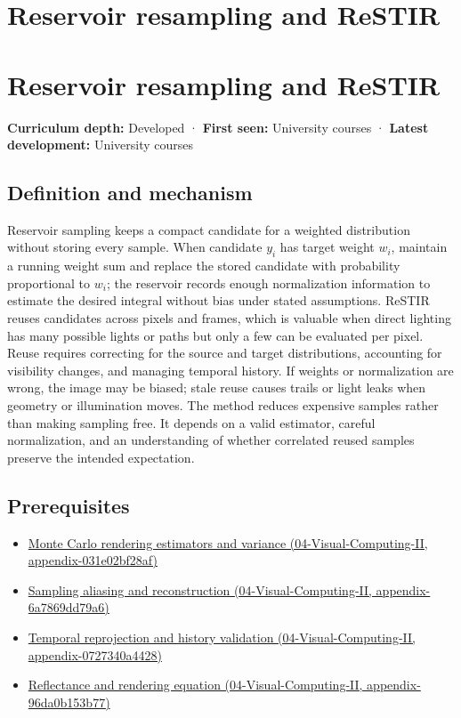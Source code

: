\hypertarget{appendix-68be451b78b1}{}
\section*{Reservoir resampling and ReSTIR}
\section{Reservoir resampling and ReSTIR}\label{appendix-68be451b78b1-reservoir-resampling-and-restir}

\textbf{Curriculum depth:} Developed · \textbf{First seen:} University courses · \textbf{Latest development:} University courses

\subsection{Definition and mechanism}\label{appendix-68be451b78b1-definition-and-mechanism}

Reservoir sampling keeps a compact candidate for a weighted distribution without storing every sample. When candidate \(y_i\) has target weight \(w_i\), maintain a running weight sum and replace the stored candidate with probability proportional to \(w_i\); the reservoir records enough normalization information to estimate the desired integral without bias under stated assumptions. ReSTIR reuses candidates across pixels and frames, which is valuable when direct lighting has many possible lights or paths but only a few can be evaluated per pixel. Reuse requires correcting for the source and target distributions, accounting for visibility changes, and managing temporal history. If weights or normalization are wrong, the image may be biased; stale reuse causes trails or light leaks when geometry or illumination moves. The method reduces expensive samples rather than making sampling free. It depends on a valid estimator, careful normalization, and an understanding of whether correlated reused samples preserve the intended expectation.

\subsection{Prerequisites}\label{appendix-68be451b78b1-prerequisites}

\begin{itemize}
\tightlist
\item
  \href{../04-Visual-Computing-II/main.pdf\#nameddest=appendix-031e02bf28af}{Monte Carlo rendering estimators and variance (04-Visual-Computing-II, appendix-031e02bf28af)}
\item
  \href{../04-Visual-Computing-II/main.pdf\#nameddest=appendix-6a7869dd79a6}{Sampling aliasing and reconstruction (04-Visual-Computing-II, appendix-6a7869dd79a6)}
\item
  \href{../04-Visual-Computing-II/main.pdf\#nameddest=appendix-0727340a4428}{Temporal reprojection and history validation (04-Visual-Computing-II, appendix-0727340a4428)}
\item
  \href{../04-Visual-Computing-II/main.pdf\#nameddest=appendix-96da0b153b77}{Reflectance and rendering equation (04-Visual-Computing-II, appendix-96da0b153b77)}
\end{itemize}

